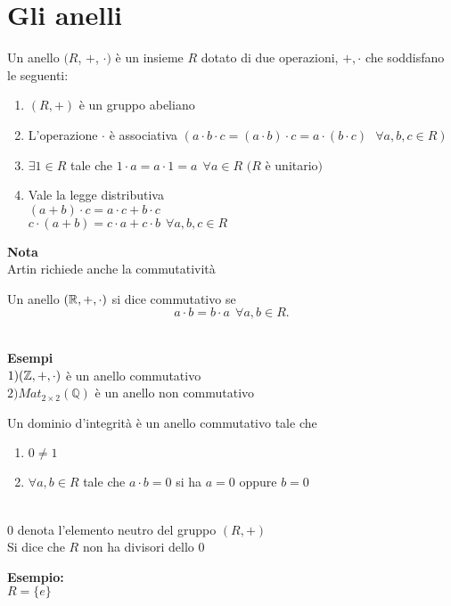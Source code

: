 \documentclass[12px]{article}
\begin{document}
	\section{Gli anelli}
	\begin{defi}
		Un anello $(R$, $+$, $\cdot)$ è un insieme $R$ dotato di due operazioni, $+,\cdot$ che soddisfano le seguenti:
		\begin{enumerate}
			\item $(R, + )$ è un gruppo abeliano
			\item L'operazione $\cdot$ è associativa $(a\cdot b\cdot c = (a\cdot b)\cdot c = a\cdot (b\cdot c) \ \ \ \forall a,b,c\in R) $ 
			\item $\exists 1\in R $ tale che $1\cdot a  = a \cdot 1  = a \ \ \forall a\in R$ $(R$ è unitario$)$
			\item Vale la legge distributiva \\$ (a + b)\cdot c= a\cdot c + b\cdot c$ \\
				$c\cdot (a + b) = c\cdot a + c\cdot b \ \ \forall a,b,c\in R$
		\end{enumerate}
\textbf{Nota}\\
Artin richiede  anche la commutatività

	\end{defi}
	\begin{defi}
		Un anello $(\mathbb{R},+,\cdot)$ si dice commutativo se 
		\[
		a\cdot b = b\cdot a \ \ \forall a,b\in R
		.\] 
	\end{defi}
	\newpage \ \\
	\textbf{Esempi}\\
	$1)(\mathbb{Z}, + , \cdot ) $ è un anello commutativo\\
	$2) Mat_{2\times 2}(\mathbb Q)$ è un anello non commutativo\\
	\begin{defi}
		Un dominio d'integrità è un anello commutativo tale che
		\begin{enumerate}
			\item $0\neq 1$
			\item  $\forall a,b\in R$ tale che $a\cdot b = 0$ si ha  $a = 0$ oppure $b = 0$
		\end{enumerate}\\
		$0$ denota l'elemento neutro del gruppo $(R,+)$\\
		Si dice che $R$ non ha divisori dello $0$
	\end{defi}
	\textbf{Esempio:}\\
	$R = \{e\}$\\
\end{document}

